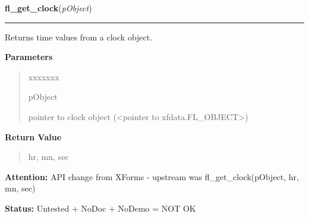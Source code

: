     \label{xformslib:library:fl_get_clock}

    \vspace{0.5ex}

\hspace{.8\funcindent}\begin{boxedminipage}{\funcwidth}

    \raggedright \textbf{fl\_get\_clock}(\textit{pObject})

    \vspace{-1.5ex}

    \rule{\textwidth}{0.5\fboxrule}
\setlength{\parskip}{2ex}
    Returns time values from a clock object.

\setlength{\parskip}{1ex}
      \textbf{Parameters}
      \vspace{-1ex}

      \begin{quote}
        \begin{Ventry}{xxxxxxx}

          \item[pObject]

          pointer to clock object ({\textless}pointer to 
          xfdata.FL\_OBJECT{\textgreater})

        \end{Ventry}

      \end{quote}

      \textbf{Return Value}
    \vspace{-1ex}

      \begin{quote}
      hr, mn, sec

      \end{quote}

\textbf{Attention:} API change from XForms - upstream was fl\_get\_clock(pObject, hr, mn, sec)



\textbf{Status:} Untested + NoDoc + NoDemo = NOT OK



    \end{boxedminipage}

    \label{xformslib:library:fl_set_clock_adjustment}

